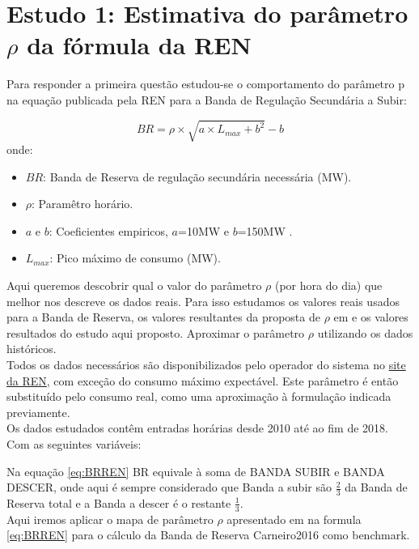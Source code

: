 \chapter{Estudo 1: Estimativa do parâmetro $\rho$ da fórmula da REN}



Para responder a primeira questão estudou-se o comportamento do parâmetro p na equação publicada pela REN para a Banda de Regulação Secundária a Subir:

\begin{equation} \label{eq:BRREN} 
    BR = \rho \times \sqrt{a \times  L_{max} + b^{2}} - b 
\end{equation}
onde:
\begin{itemize}
  \item $BR$: Banda de Reserva  de regulação secundária necessária (MW).
  \item $\rho$: Paramêtro horário.
  \item $a$ e $b$: Coeficientes empiricos, $a$=10MW e $b$=150MW .
  \item $L_{max}$: Pico máximo de consumo (MW).
\end{itemize}

Aqui queremos descobrir qual o valor do parâmetro $\rho$ (por hora do dia) que melhor nos descreve os dados reais. Para isso estudamos os valores reais usados para a Banda de Reserva, os valores resultantes da proposta de $\rho$  em \cite{Carneiro2016} e os valores resultados do estudo aqui proposto. Aproximar o parâmetro $\rho$  utilizando os dados históricos. \\
Todos os dados necessários são disponibilizados pelo operador do sistema no \href{https://mercado.ren.pt/PT/Electr}{site da REN}, com exceção do consumo máximo expectável. Este parâmetro é então substituído pelo consumo real, como uma aproximação à formulação indicada previamente.\\
Os dados estudados contêm entradas horárias desde 2010 até ao fim de 2018. Com as seguintes variáveis:\\

\begin{table}[H] \centering \caption{Dados REN}  \end{table}

Na equação \ref{eq:BRREN} BR equivale à soma de BANDA SUBIR e BANDA DESCER, onde aqui é sempre considerado que Banda a subir são $\frac{2}{3}$ da Banda de Reserva total e a Banda a descer é o restante $\frac{1}{3}$. \\
Aqui iremos aplicar o mapa de parâmetro $\rho$ apresentado em \cite{Carneiro2016} na formula \ref{eq:BRREN} para o cálculo da Banda de Reserva Carneiro2016 como benchmark. \\

